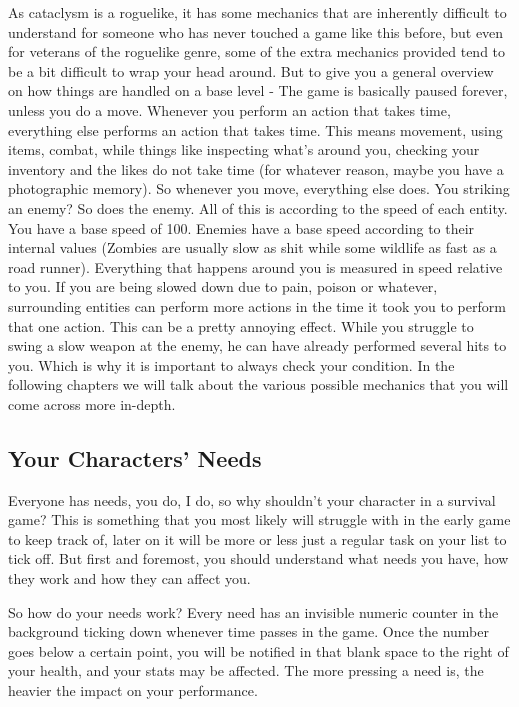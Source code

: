 \documentclass[11pt]{report}
\begin{document}
As cataclysm is a roguelike, it has some mechanics that are inherently difficult to understand for someone who has never touched a game like this before, but even for veterans of the roguelike genre, some of the extra mechanics provided tend to be a bit difficult to wrap your head around. But to give you a general overview on how things are handled on a base level - The game is basically paused forever, unless you do a move. Whenever you perform an action that takes time, everything else performs an action that takes time. This means movement, using items, combat, while things like inspecting what's around you, checking your inventory and the likes do not take time (for whatever reason, maybe you have a photographic memory). So whenever you move, everything else does. You striking an enemy? So does the enemy. All of this is according to the speed of each entity. You have a base speed of 100. Enemies have a base speed according to their internal values (Zombies are usually slow as shit while some wildlife as fast as a road runner). Everything that happens around you is measured in speed relative to you. If you are being slowed down due to pain, poison or whatever, surrounding entities can perform more actions in the time it took you to perform that one action. This can be a pretty annoying effect. While you struggle to swing a slow weapon at the enemy, he can have already performed several hits to you. Which is why it is important to always check your condition. In the following chapters we will talk about the various possible mechanics that you will come across more in-depth.

\subsection{Your Characters' Needs}

Everyone has needs, you do, I do, so why shouldn't your character in a survival game? This is something that you most likely will struggle with in the early game to keep track of, later on it will be more or less just a regular task on your list to tick off. But first and foremost, you should understand what needs you have, how they work and how they can affect you.

So how do your needs work? Every need has an invisible numeric counter in the background ticking down whenever time passes in the game. Once the number goes below a certain point, you will be notified in that blank space to the right of your health, and your stats may be affected. The more pressing a need is, the heavier the impact on your performance.
\end{document}

